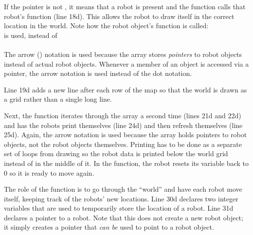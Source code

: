 If the pointer is not , it means that a robot is present and the function calls that robot's  function (line 18d).  This allows the robot to draw itself in the correct location in the world.  Note how the robot object's  function is called:\\
 is used, instead of\\
\\
The arrow (\codefont{->}) notation is used because the array  stores \emph{pointers} to robot objects instead of actual robot objects.  Whenever a member of an object is accessed via a pointer, the arrow notation is used instead of the dot notation.


 Line 19d adds a new line after each row of the map so that the world is drawn as a grid rather than a single long line.

Next, the  function iterates through the  array a second time (lines 21d and 22d) and has the robots print themselves (line 24d) and then refresh themselves (line 25d).  Again, the arrow notation is used because the  array holds pointers to robot objects, not the robot objects themselves.
Printing has to be done as a separate set of loops from drawing so the robot data is printed below the world grid instead of in the middle of it.  In the  function, the robot resets its  variable back to 0 so it is ready to move again.


The role of the  function is to go through the ``world'' and have each robot move itself, keeping track of the robots' new locations.   Line 30d declares two integer variables that are used to temporarily store the location of a robot.  Line 31d declares a pointer to a robot.  Note that this does not create a new robot object; it simply creates a pointer that \emph{can be} used to point to a robot object.

